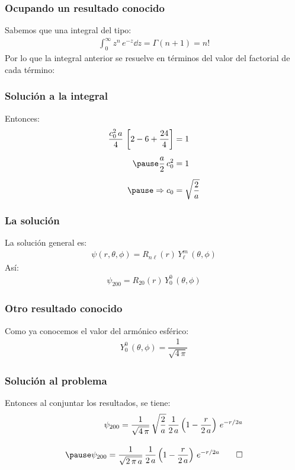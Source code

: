 \documentclass[12pt]{beamer}
\begin{document}
\begin{frame}
\frametitle{Ocupando un resultado conocido}
Sabemos que una integral del tipo:
\begin{align*}
\int_{0}^{\infty} z^{n} \, e^{-z} \dd{z} = \Gamma(n + 1) = n!
\end{align*}
\pause
Por lo que la integral anterior se resuelve en términos del valor del factorial de cada término:
\end{frame}
\begin{frame}
\frametitle{Solución a la integral}
Entonces:
\begin{equation*}
\begin{aligned}
\dfrac{c_{0}^{2} \, a}{4} \, \left[ 2 - 6 + \dfrac{24}{4} \right]  &= 1 \\[0.5em] \pause
\dfrac{a}{2} \, c_{0}^{2} &= 1 \\[0.5em] \pause
\Rightarrow c_{0} &= \sqrt{\dfrac{2}{a}}
\end{aligned}
\end{equation*}
\end{frame}
\begin{frame}
\frametitle{La solución}
La solución general es:
\begin{align*}
\psi(r, \theta, \phi) = R_{n \ell} (r) \, Y_{\ell}^{m} \, (\theta, \phi)
\end{align*}
\pause
Así:
\begin{align*}
\psi_{200} = R_{2 0} (r) \, Y_{0}^{0} \, (\theta, \phi)
\end{align*}
\end{frame}
\begin{frame}
\frametitle{Otro resultado conocido}
Como ya conocemos el valor del armónico esférico:
\begin{align*}
Y_{0}^{0} \, (\theta, \phi) = \dfrac{1}{\sqrt{4 \, \pi}}
\end{align*}
\end{frame}
\begin{frame}
\frametitle{Solución al problema}
Entonces al conjuntar los resultados, se tiene:
\begin{equation*}
\begin{aligned}
\psi_{200} = \dfrac{1}{\sqrt{4 \, \pi}} \, \sqrt{\dfrac{2}{a}} \, \dfrac{1}{2 \, a} \left( 1 - \dfrac{r}{2 \, a} \right) \, e^{-r/2a} \\[1em] \pause
\psi_{200} = \dfrac{1}{\sqrt{2 \, \pi \, a}} \, \dfrac{1}{2 \, a} \left( 1 - \dfrac{r}{2 \, a} \right) \, e^{-r/2a} \qed
\end{aligned}
\end{equation*}
\end{frame}
\end{document}
